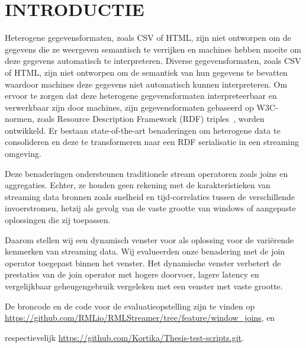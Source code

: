 \section{INTRODUCTIE}
\label{chap:intro}

Heterogene gegevensformaten, zoals CSV of HTML, zijn niet
ontworpen om de gegevens die ze weergeven semantisch te verrijken en 
machines hebben moeite om deze gegevens automatisch te interpreteren.
Diverse gegevensformaten, zoals CSV of HTML, zijn niet ontworpen om de semantiek van hun gegevens te bevatten
waardoor machines deze gegevens niet automatisch kunnen interpreteren. 
Om ervoor te zorgen dat deze heterogene gegevensformaten interpreteerbaar en 
verwerkbaar zijn door machines, zijn gegevensformaten gebaseerd op W3C-normen, zoals Resource Description 
Framework (RDF) triples~\cite{intro_rdf}, worden ontwikkeld. 
Er bestaan state-of-the-art benaderingen om heterogene data te consolideren
en deze te transformeren naar een RDF serialisatie in een streaming omgeving. 

Deze benaderingen ondersteunen traditionele stream operatoren zoals joins en aggregaties. 
Echter, ze houden geen rekening met
de karakteristieken van streaming data bronnen zoals snelheid en 
tijd-correlaties tussen de verschillende
invoerstromen, hetzij als gevolg van de 
vaste grootte van windows of aangepaste oplossingen die zij toepassen. 

Daarom stellen wij een dynamisch venster voor als oplossing voor de variërende kenmerken van streaming data. Wij evalueerden onze 
benadering met de join operator toegepast binnen het venster. 
Het dynamische venster verbetert de prestaties van de 
join operator met hogere doorvoer, lagere latency en 
vergelijkbaar geheugengebruik vergeleken met een venster met vaste grootte.

De broncode en de code voor de evaluatieopstelling zijn te vinden op
\url{https://github.com/RMLio/RMLStreamer/tree/feature/window_joins}, en 

respectievelijk \href{https://github.com/Kortika/Thesis-test-scripts.git}{https://github.com/Kortika/Thesis-test-scripts.git}.
